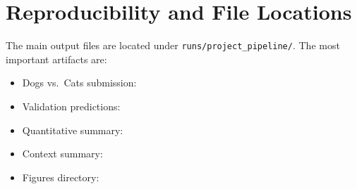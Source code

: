 \documentclass[11pt,a4paper]{article}
\begin{document}
\section{Reproducibility and File Locations}
The main output files are located under \texttt{runs/project\_pipeline/}. The most important artifacts are:
\begin{itemize}
  \item Dogs vs.\ Cats submission: 
  \item Validation predictions: 
  \item Quantitative summary: 
  \item Context summary: 
  \item Figures directory: 
\end{itemize}
\end{document}
